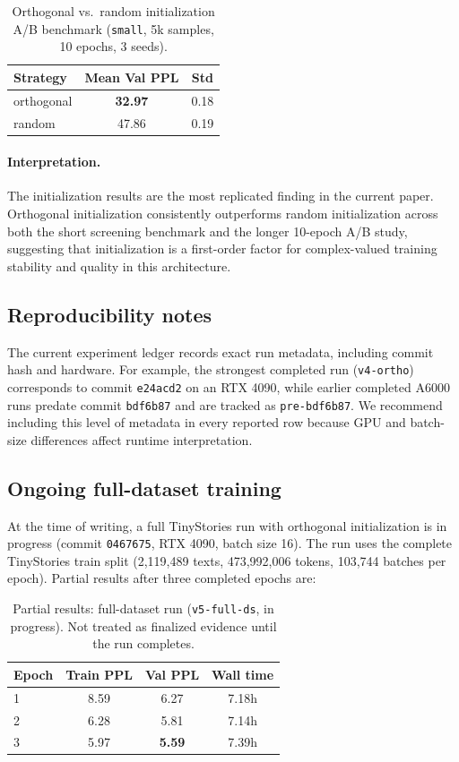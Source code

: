 \documentclass[11pt]{article}
\begin{document}
\begin{table}[h]
\centering
\caption{Orthogonal vs.\ random initialization A/B benchmark (\texttt{small}, 5k samples, 10 epochs, 3 seeds).}
\label{tab:initab}
\begin{tabular}{lcc}
\toprule
Strategy & Mean Val PPL & Std \\
\midrule
orthogonal & \textbf{32.97} & 0.18 \\
random & 47.86 & 0.19 \\
\bottomrule
\end{tabular}
\end{table}

\paragraph{Interpretation.}
The initialization results are the most replicated finding in the current paper. Orthogonal initialization consistently outperforms random initialization across both the short screening benchmark and the longer 10-epoch A/B study, suggesting that initialization is a first-order factor for complex-valued training stability and quality in this architecture.

\subsection{Reproducibility notes}
The current experiment ledger records exact run metadata, including commit hash and hardware. For example, the strongest completed run (\texttt{v4-ortho}) corresponds to commit \texttt{e24acd2} on an RTX 4090, while earlier completed A6000 runs predate commit \texttt{bdf6b87} and are tracked as \texttt{pre-bdf6b87}. We recommend including this level of metadata in every reported row because GPU and batch-size differences affect runtime interpretation.

\subsection{Ongoing full-dataset training}
At the time of writing, a full TinyStories run with orthogonal initialization is in progress (commit \texttt{0467675}, RTX 4090, batch size 16). The run uses the complete TinyStories train split (2,119,489 texts, 473,992,006 tokens, 103,744 batches per epoch). Partial results after three completed epochs are:

\begin{table}[h]
\centering
\caption{Partial results: full-dataset run (\texttt{v5-full-ds}, in progress). Not treated as finalized evidence until the run completes.}
\label{tab:fulldspartial}
\begin{tabular}{lccc}
\toprule
Epoch & Train PPL & Val PPL & Wall time \\
\midrule
1 & 8.59 & 6.27 & 7.18h \\
2 & 6.28 & 5.81 & 7.14h \\
3 & 5.97 & \textbf{5.59} & 7.39h \\
\bottomrule
\end{tabular}
\end{table}
\end{document}

